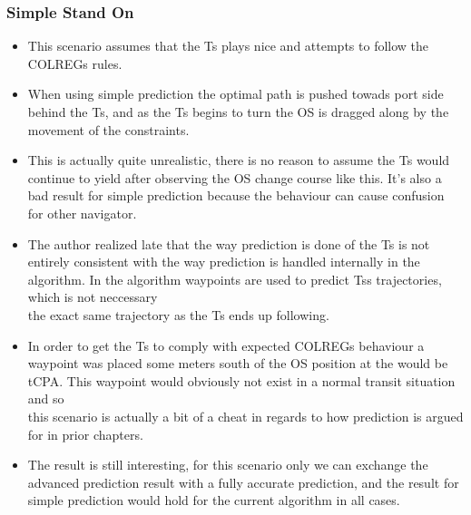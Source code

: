 \subsubsection{Simple Stand On}
\begin{itemize}
    \item This scenario assumes that the \gls{Ts} plays nice and attempts to follow the \gls{COLREGs} rules.
    \item When using simple prediction the optimal path is pushed towads port side behind the \gls{Ts}, and as the \gls{Ts} begins to turn the \gls{OS} is dragged along by the movement of the constraints.
    \item This is actually quite unrealistic, there is no reason to assume the \gls{Ts} would continue to yield after observing the \gls{OS} change course like this. It's also a bad result for simple prediction because the behaviour can cause confusion\\
    for other navigator.
    \item The author realized late that the way prediction is done of the \gls{Ts} is not entirely consistent with the way prediction is handled internally in the algorithm. In the algorithm waypoints are used to predict \gls{Ts}s trajectories, which is not neccessary\\
    the exact same trajectory as the \gls{Ts} ends up following. 
    \item In order to get the \gls{Ts} to comply with expected \gls{COLREGs} behaviour a waypoint was placed some meters south of the \gls{OS} position at the would be \gls{tCPA}. This waypoint would obviously not exist in a normal transit situation and so\\
    this scenario is actually a bit of a cheat in regards to how prediction is argued for in prior chapters.
    \item The result is still interesting, for this scenario only we can exchange the advanced prediction result with a fully accurate prediction, and the result for simple prediction would hold for the current algorithm in all cases.
\end{itemize}
